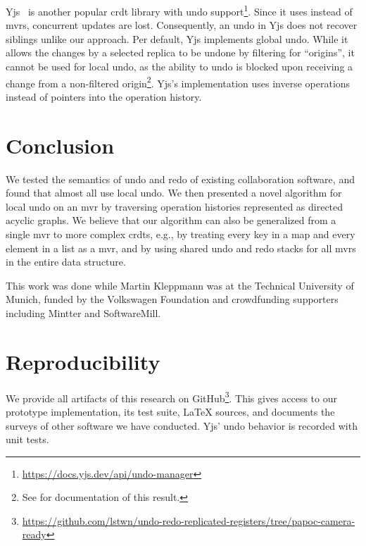 \documentclass[sigplan,10pt]{acmart}
\begin{document}
Yjs~\cite{yjspaper,yjsproject} is another popular \gls{crdt} library with
undo support\footnote{\url{https://docs.yjs.dev/api/undo-manager}}.
Since it uses  instead of \glspl{mvr}, concurrent updates are lost.
Consequently, an undo in Yjs does not recover siblings unlike our approach.
Per default, Yjs implements global undo.
While it allows the changes by a selected replica to be undone
by filtering for ``origins'',
it cannot be used for local undo, as the ability to undo is blocked
upon receiving a change from a non-filtered
origin\footnote{See  for documentation of this result.}.
Yjs's implementation uses inverse operations instead of pointers into the
operation history.

\section{Conclusion}\label{sec:conclusion}

We tested the semantics of undo and redo of existing collaboration software,
and found that almost all use local undo.
We then presented a novel algorithm for local undo on an \gls*{mvr}
by traversing operation histories represented as directed acyclic graphs.
We believe that our algorithm can also be generalized from a single \gls{mvr}
to more complex \glspl{crdt}, e.g., by treating every key in a map and
every element in a list as a \gls{mvr}, and by using shared
undo and redo stacks for all \glspl{mvr} in the entire data structure.

\begin{acks}
This work was done while Martin Kleppmann was at the Technical University of Munich,
funded by the Volkswagen Foundation and crowdfunding supporters including Mintter
and SoftwareMill.
\end{acks}





\appendix

\section{Reproducibility}\label{sec:repro}

We provide all artifacts of this research on GitHub\footnote{
  \url{https://github.com/lstwn/undo-redo-replicated-registers/tree/papoc-camera-ready}
}.
This gives access to our prototype implementation, its test suite,
\LaTeX{} sources, and documents the surveys of other software
we have conducted.
Yjs' undo behavior is recorded with unit tests.
\end{document}
